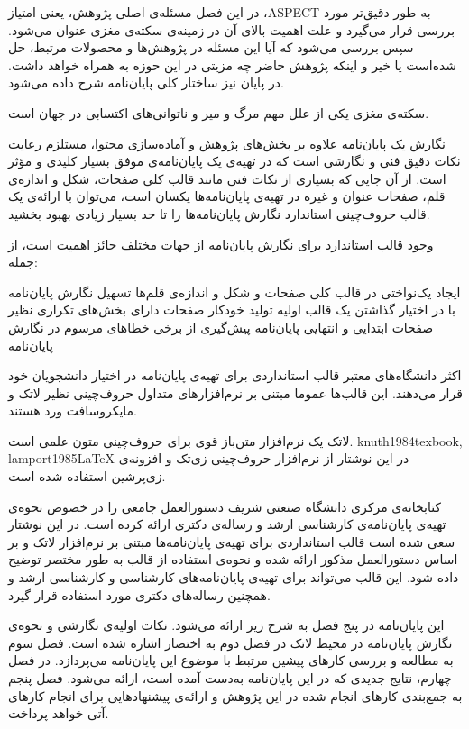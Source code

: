 

در این فصل مسئله‌ی اصلی پژوهش، یعنی امتیاز ،ASPECT به طور دقیق‌تر مورد بررسی قرار می‌گیرد و علت اهمیت بالای آن در زمینه‌ی سکته‌ی مغزی عنوان می‌شود.
سپس بررسی می‌شود که آیا این مسئله در پژوهش‌ها و محصولات مرتبط، حل شده‌است یا خیر و اینکه پژوهش حاضر چه مزیتی در این حوزه به همراه خواهد داشت.
در پایان نیز ساختار کلی پایان‌نامه شرح داده می‌شود.


سکته‌ی مغزی یکی از علل مهم مرگ و میر و ناتوانی‌های اکتسابی در جهان است.

نگارش یک پایان‌نامه‌ علاوه بر بخش‌های پژوهش و آماده‌سازی محتوا،
مستلزم رعایت نکات دقیق فنی و نگارشی است 
که در تهیه‌ی یک پایان‌نامه‌ی موفق بسیار کلیدی و مؤثر است.
از آن جایی که بسیاری از نکات فنی مانند قالب کلی صفحات، شکل و اندازه‌ی قلم، 
صفحات عنوان و غیره در تهیه‌ی پایان‌نامه‌ها یکسان است،
می‌توان با ارائه‌ی یک قالب حروف‌چینی استاندارد 
نگارش پایان‌نامه‌ها را تا حد بسیار زیادی بهبود بخشید.


وجود قالب استاندارد برای نگارش پایان‌نامه از جهات مختلف حائز اهمیت است، از جمله:

ایجاد یک‌نواختی در قالب کلی صفحات و شکل و اندازه‌ی قلم‌ها
تسهیل نگارش پایان‌نامه با در اختیار گذاشتن یک قالب اولیه 
تولید خودکار صفحات دارای بخش‌های تکراری نظیر صفحات ابتدایی و انتهایی پایان‌نامه
پیش‌گیری از برخی خطاهای مرسوم در نگارش پایان‌نامه


اکثر دانشگاه‌های معتبر قالب استانداردی برای تهیه‌ی پایان‌نامه در اختیار دانشجویان خود قرار می‌دهند.
این قالب‌ها عموما مبتنی بر نرم‌افزارهای متداول حروف‌چینی نظیر لاتک و مایکروسافت ورد هستند.

 لاتک یک نرم‌افزار متن‌باز قوی برای حروف‌چینی متون علمی است.
 {knuth1984texbook, lamport1985LaTeX} 
در این نوشتار از نرم‌افزار حروف‌چینی زی‌تک 
 و افزونه‌ی زی‌پرشین
 استفاده شده است.



کتابخانه‌ی مرکزی دانشگاه صنعتی شریف دستورالعمل جامعی را در خصوص
نحوه‌ی تهیه‌ی پایان‌نامه‌ی کارشناسی ارشد و رساله‌ی دکتری ارائه کرده است.
در این نوشتار سعی شده است قالب استانداردی برای تهیه‌ی پایان‌نامه‌ها مبتنی بر نرم‌افزار لاتک و
بر اساس دستورالعمل مذکور ارائه شده و
نحوه‌ی استفاده از قالب به طور مختصر توضیح داده شود.
این قالب  می‌تواند برای تهیه‌ی پایان‌نامه‌های کارشناسی و کارشناسی ارشد 
و همچنین رساله‌ها‌ی دکتری مورد استفاده قرار گیرد.


این پایان‌نامه در پنج فصل به شرح زیر ارائه می‌شود.
نکات اولیه‌ی نگارشی و نحوه‌ی نگارش پایان‌نامه در محیط لاتک در  فصل دوم به اختصار اشاره شده است. 
فصل سوم به مطالعه و بررسی کارهای پیشین مرتبط با موضوع این پایان‌نامه می‌پردازد.
در فصل چهارم، نتایج جدیدی که در این پایان‌نامه به‌دست آمده است، ارائه می‌شود.
فصل پنجم به جمع‌بندی کارهای انجام شده در این پژوهش و ارائه‌ی پیشنهادهایی برای انجام کارهای آتی خواهد پرداخت.